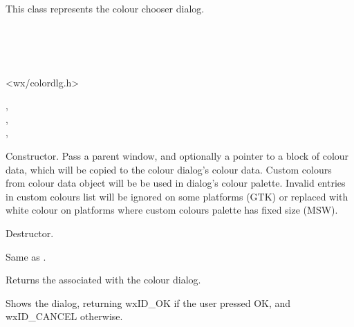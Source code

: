 \section{}\label{wxcolourdialog}

This class represents the colour chooser dialog.


\\
\\
\\


<wx/colordlg.h>


,\\
,\\
,\\


\label{wxcolourdialogctor}


Constructor. Pass a parent window, and optionally a pointer to a block of colour
data, which will be copied to the colour dialog's colour data. Custom
colours from colour data object will be be used in dialog's colour palette.
Invalid entries in custom colours list will be ignored on some platforms (GTK)
or replaced with white colour on platforms where custom colours palette has
fixed size (MSW).



\label{wxcolourdialogdtor}


Destructor.

\label{wxcolourdialogcreate}


Same as .

\label{wxcolourdialoggetcolourdata}


Returns the  associated with the colour dialog.

\label{wxcolourdialogshowmodal}


Shows the dialog, returning wxID\_OK if the user pressed OK, and wxID\_CANCEL
otherwise.


